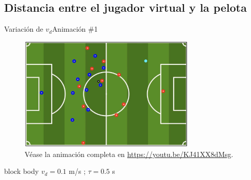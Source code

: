 \documentclass{beamer}
\begin{document}
        \subsection{Distancia entre el jugador virtual y la pelota}

            \begin{frame}{Variación de $v_d$}{Animación \#1}
                \vspace*{-0.3cm}
                \begin{figure}[H!]
                    \includegraphics[width=0.75\textwidth]{./animacion_2}
                    \caption*{Véase la animación completa en \url{https://youtu.be/KJ41XX8dMsg}.}
                    \label{fig:futbol_2}
                \end{figure}
                \vspace*{-0.5cm}
                \begin{beamercolorbox}[sep=5pt,center]{block body}
                    \centering
                    \small{$v_d = 0.1$ m/s ; $\tau = 0.5$ s}
                \end{beamercolorbox}
            \end{frame}
\end{document}
